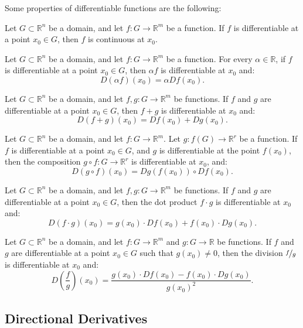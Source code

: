 Some properties of differentiable functions are the following:
\begin{prop}
    Let $G\subset \mathbb{R}^n$ be a domain, and let $f : G \to \mathbb{R}^m$ be a function. If $f$ is differentiable at a point $x_0 \in G$, then $f$ is continuous at $x_0$.
\end{prop}
\begin{prop}
    Let $G\subset \mathbb{R}^n$ be a domain, and let $f : G \to \mathbb{R}^m$ be a function. For every $\alpha \in \mathbb{R}$, if $f$ is differentiable at a point $x_0 \in G$, then $\alpha f$ is differentiable at $x_0$ and:
    \[
        D(\alpha f)(x_0) = \alpha Df(x_0).
    \]
\end{prop}
\begin{prop}
    Let $G\subset \mathbb{R}^n$ be a domain, and let $f, g : G \to \mathbb{R}^m$ be functions. If $f$ and $g$ are differentiable at a point $x_0 \in G$, then $f + g$ is differentiable at $x_0$ and:
    \[
        D(f + g)(x_0) = Df(x_0) + Dg(x_0).
    \]
\end{prop}
\begin{prop}
    Let $G\subset \mathbb{R}^n$ be a domain, and let $f : G \to \mathbb{R}^m$. Let $g:f(G) \to \mathbb{R}^r$ be a function. If $f$ is differentiable at a point $x_0 \in G$, and $g$ is differentiable at the point $f(x_0)$, then the composition $g \circ f : G \to \mathbb{R}^r$ is differentiable at $x_0$, and:
    \[
        D(g \circ f)(x_0) = Dg(f(x_0)) \circ Df(x_0).
    \]
\end{prop}
\begin{prop}
    Let $G\subset \mathbb{R}^n$ be a domain, and let $f, g : G \to \mathbb{R}^m$ be functions. If $f$ and $g$ are differentiable at a point $x_0 \in G$, then the dot product $f \cdot g$ is differentiable at $x_0$ and:
    \[
        D(f \cdot g)(x_0) = g(x_0) \cdot Df(x_0) + f(x_0) \cdot Dg(x_0).
    \]
\end{prop}
\begin{prop}
    Let $G\subset \mathbb{R}^n$ be a domain, and let $f : G \to \mathbb{R}^m$ and $g : G \to \mathbb{R}$ be functions. If $f$ and $g$ are differentiable at a point $x_0 \in G$ such that $g(x_0)\neq 0$, then the division $\nicefrac{f}{g}$ is differentiable at $x_0$ and:
    \[
        D\left(\frac{f}{g}\right)(x_0) = \frac{g(x_0) \cdot Df(x_0) - f(x_0) \cdot Dg(x_0)}{g(x_0)^2}.
    \]
\end{prop}


\subsection{Directional Derivatives}

